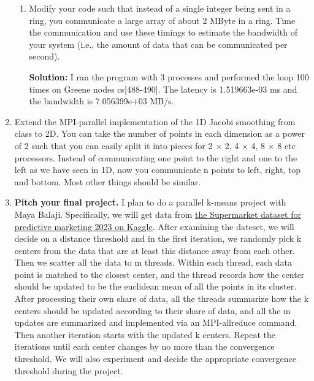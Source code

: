\documentclass{article}
\begin{document}
\begin{enumerate}
\begin{enumerate}
    \item Modify your code such that instead of a single integer being sent in a ring, you communicate a large array of about 2 MByte in a ring. Time the communication and use these timings to estimate the bandwidth of your system (i.e., the amount of data that can be communicated per second).

    \textbf{Solution:} I ran the program with 3 processes and performed the loop 100 times on Greene nodes cs[488-490]. The latency is 1.519663e-03 ms and the bandwidth is 7.056399e+03 MB/s.

\end{enumerate}

\item Extend the MPI-parallel implementation of the 1D Jacobi smoothing from class to 2D. You can take the number of points in each dimension as a power of 2 such that you can easily split it into pieces for 2 $\times$ 2, 4 $\times$ 4, 8 $\times$ 8 etc processors. Instead of communicating one point to the right and one to the left as we have seen in 1D, now you communicate n points to left, right, top and bottom. Most other things should be similar.

\item \textbf{Pitch your final project.} I plan to do a parallel k-means project with Maya Balaji. Specifically, we will get data from  \href{https://www.kaggle.com/datasets/hunter0007/ecommerce-dataset-for-predictive-marketing-2023}{the Supermarket dataset for predictive marketing 2023 on Kaggle}. After examining the dateset, we will decide on a distance threshold and in the first iteration, we randomly pick k centers from the data that are at least this distance away from each other. Then we scatter all the data to m threads. Within each thread, each data point is matched to the closest center, and the thread records how the center should be updated to be the euclidean mean of all the points in its cluster. After processing their own share of data, all the threads summarize how the k centers should be updated according to their share of data, and all the m updates are summarized and implemented via an MPI-allreduce command. Then another iteration starts with the updated k centers. Repeat the iterations until each center changes by no more than the convergence threshold. We will also experiment and decide the appropriate convergence threshold during the project. 
\end{enumerate}
\end{document}
